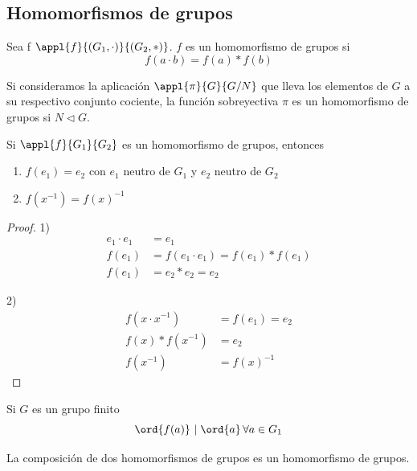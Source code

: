 \documentclass[nochap]{apuntes}
\begin{document}
 \subsection{Homomorfismos de grupos}
 \begin{defn}[Homomorfismo]
 Sea f $\appl{f}{(G_1, \cdot )}{(G_2, \ast )}$. $f$ es un homomorfismo de grupos si 
 \[ f(a\cdot b) = f(a)\ast f(b) \]
 \end{defn}
 
 \begin{example}
 Si consideramos la aplicación $\appl{\pi}{G}{G/N}$ que lleva los elementos de $G$ a su respectivo conjunto cociente, la función sobreyectiva $\pi$ es un homomorfismo de grupos si $N\lhd G$.
 \end{example}
 
 \begin{props} 
 Si $\appl{f}{G_1}{G_2}$ es un homomorfismo de grupos, entonces
 \begin{enumerate}
 \item $f(e_1) = e_2$ con $e_1$ neutro de $G_1$ y $e_2$ neutro de $G_2$
 \item $f(x^{-1}) = f(x)^{-1}$
 \end{enumerate}
 \end{props}
 
 \begin{proof} 
 1) 
 \begin{align*}
 e_1\cdot e_1 &= e_1 \\
 f(e_1)& =f(e_1\cdot e_1) = f(e_1)\ast f(e_1) \\
 f(e_1) &= e_2 \ast e_2 = e_2
 \end{align*}

 2) \begin{align*}
 f(x\cdot x^{-1}) &= f(e_1) = e_2 \\ 
 f(x)\ast f(x^{-1}) &= e_2 \\
  f(x^{-1}) &= f(x)^{-1}
  \end{align*}
 
 \end{proof}
 
 

\begin{remark} Si $G$ es un grupo finito \[\ord{f(a)}\ |\;\ord{a}\, \forall a \in G_1 \] \end{remark}

\begin{lemma}
La composición de dos homomorfismos de grupos es un homomorfismo de grupos.
\end{lemma}
\end{document}
